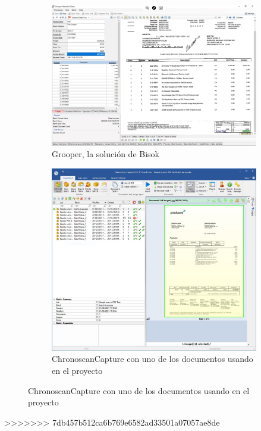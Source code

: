 \begin{figure}
    \centering
    \begin{subfigure}[b]{0.9\textwidth}
        \centering
        \includegraphics[width=\textwidth]{imaxes/b-estado-arte/bisok-grooper}
        \caption{Grooper, la solución de Bisok}
        \label{fig:grooper-bisok}
    \end{subfigure}
    \begin{subfigure}[b]{0.8\textwidth}
        \centering
        \includegraphics[width=\textwidth]{imaxes/b-estado-arte/chronoscan-capture}
        \caption{ChronoscanCapture con uno de los documentos usando en el proyecto}
        \label{fig:chronoscan-capture}
    \end{subfigure}
\end{figure}
>>>>>>> 7db457b512ca6b769e6582ad33501a07057ae8de
